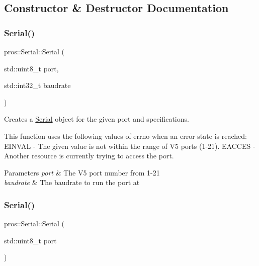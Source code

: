 \subsection{Constructor \& Destructor Documentation}
\mbox{\label{classpros_1_1Serial_a20b7c3c88af816af3078939b048dcf4b}} 
\subsubsection{\texorpdfstring{Serial()}{Serial()}\hspace{0.1cm}{\footnotesize\ttfamily [1/2]}}
{\footnotesize\ttfamily pros\+::\+Serial\+::\+Serial (\begin{DoxyParamCaption}\item[{std\+::uint8\+\_\+t}]{port,  }\item[{std\+::int32\+\_\+t}]{baudrate }\end{DoxyParamCaption})\hspace{0.3cm}{\ttfamily [explicit]}}

Creates a \hyperlink{classpros_1_1Serial}{Serial} object for the given port and specifications.

This function uses the following values of errno when an error state is reached\+: E\+I\+N\+V\+AL -\/ The given value is not within the range of V5 ports (1-\/21). E\+A\+C\+C\+ES -\/ Another resource is currently trying to access the port.


\begin{DoxyParams}{Parameters}
{\em port} & The V5 port number from 1-\/21 \\
\hline
{\em baudrate} & The baudrate to run the port at \\
\hline
\end{DoxyParams}
\mbox{\label{classpros_1_1Serial_a32311eebb33cab5a52e0a8743d3bd9da}} 
\subsubsection{\texorpdfstring{Serial()}{Serial()}\hspace{0.1cm}{\footnotesize\ttfamily [2/2]}}
{\footnotesize\ttfamily pros\+::\+Serial\+::\+Serial (\begin{DoxyParamCaption}\item[{std\+::uint8\+\_\+t}]{port }\end{DoxyParamCaption})\hspace{0.3cm}{\ttfamily [explicit]}}



